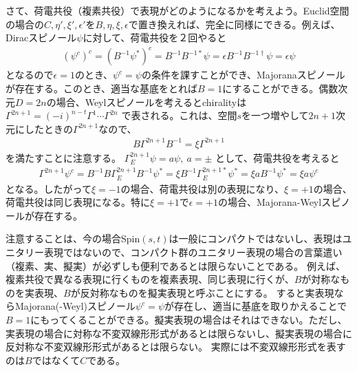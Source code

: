 \documentclass[12pt,a4paper]{jlreq}
\begin{document}
さて、荷電共役（複素共役）で表現がどのようになるかを考えよう。Euclid空間の場合の$C,\eta',\xi',\epsilon'$を$B,\eta,\xi,\epsilon$で置き換えれば、完全に同様にできる。例えば、Diracスピノール$\psi$に対して、荷電共役を２回やると
\begin{align*}
  (\psi^c)^c=(B^{-1}\psi^{*})^c
  =B^{-1}B^{-1*}\psi
  =\epsilon B^{-1}B^{-1\dag}\psi
  =\epsilon \psi
\end{align*}
となるので$\epsilon=1$のとき、$\psi^c=\psi$の条件を課すことができ、Majoranaスピノールが存在する。このとき、適当な基底をとれば$B=1$にすることができる。偶数次元$D=2n$の場合、Weylスピノールを考えるとchiralityは$\Gamma^{2n+1}=(-i)^{n-t}\Gamma^{1}\cdots \Gamma^{2n}$
で表される。これは、空間$s$を一つ増やして$2n+1$次元にしたときの$\Gamma^{2n+1}$なので、
\begin{align*}
  B\Gamma^{2n+1}B^{-1}=\xi\Gamma^{2n+1}
\end{align*}
を満たすことに注意する。
$\Gamma_E^{2n+1}\psi=a\psi,\ a=\pm$ として、荷電共役を考えると
\begin{align*}
  \Gamma^{2n+1}\psi^c 
  = B^{-1}B\Gamma_E^{2n+1}B^{-1} \psi^{*}
  = \xi B^{-1}\Gamma_E^{2n+1 *} \psi^{*}
  =\xi a B^{-1}\psi^{*}
  =\xi a \psi^c 
\end{align*}
となる。したがって$\xi=-1$の場合、荷電共役は別の表現になり、$\xi=+1$の場合、荷電共役は同じ表現になる。特に$\xi=+1$で$\epsilon=+1$の場合、Majorana-Weylスピノールが存在する。

注意することは、今の場合Spin$(s,t)$は一般にコンパクトではないし、表現はユニタリー表現ではないので、コンパクト群のユニタリー表現の場合の言葉遣い（複素、実、擬実）が必ずしも便利であるとは限らないことである。
例えば、複素共役で異なる表現に行くものを複素表現、同じ表現に行くが、$B$が対称なものを実表現、$B$が反対称なものを擬実表現と呼ぶことにする。
すると実表現ならMajorana(-Weyl)スピノール$\psi^c=\psi$が存在し、適当に基底を取りかえることで$B=1$にもってくることができる。擬実表現の場合はそれはできない。ただし、実表現の場合に対称な不変双線形形式があるとは限らないし、擬実表現の場合に反対称な不変双線形形式があるとは限らない。
実際には不変双線形形式を表すのは$B$ではなくて$C$である。
\end{document}
